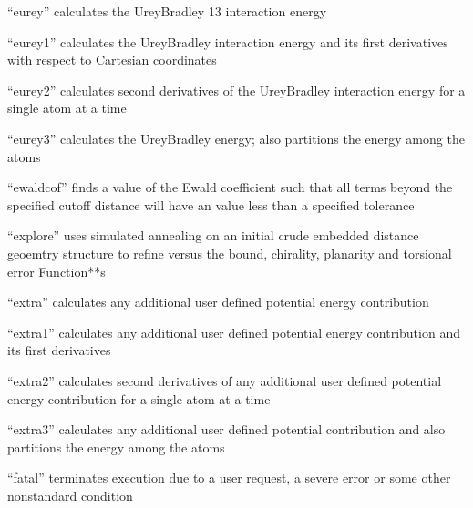 \documentclass[letterpaper,11pt,english]{sphinxmanual}
\begin{document}
“eurey” calculates the Urey\sphinxhyphen{}Bradley 1\sphinxhyphen{}3 interaction energy


“eurey1” calculates the Urey\sphinxhyphen{}Bradley interaction energy and its first derivatives with respect to Cartesian coordinates


“eurey2” calculates second derivatives of the Urey\sphinxhyphen{}Bradley interaction energy for a single atom at a time


“eurey3” calculates the Urey\sphinxhyphen{}Bradley energy; also partitions the energy among the atoms


“ewaldcof” finds a value of the Ewald coefficient such that all terms beyond the specified cutoff distance will have an value less than a specified tolerance


“explore” uses simulated annealing on an initial crude embedded distance geoemtry structure to refine versus the bound, chirality, planarity and torsional error Function**s


“extra” calculates any additional user defined potential energy contribution


“extra1” calculates any additional user defined potential energy contribution and its first derivatives


“extra2” calculates second derivatives of any additional user defined potential energy contribution for a single atom at a time


“extra3” calculates any additional user defined potential contribution and also partitions the energy among the atoms


“fatal” terminates execution due to a user request, a severe error or some other nonstandard condition

\end{document}

